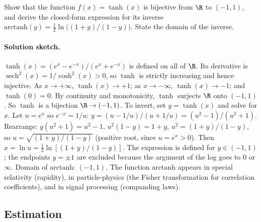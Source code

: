 \begin{exercise}
Show that the function $f(x) = \tanh(x)$ is bijective from $\R$ to
$(-1, 1)$, and derive the closed-form expression for its inverse
$\mathrm{arctanh}(y) = \tfrac{1}{2} \ln\bigl((1+y)/(1-y)\bigr)$.
State the domain of the inverse.

\paragraph{Solution sketch.}
$\tanh(x) = (e^{x} - e^{-x})/(e^{x} + e^{-x})$ is defined on all
of $\R$. Its derivative is $\operatorname{sech}^{2}(x) = 1/\cosh^{2}
(x) > 0$, so $\tanh$ is strictly increasing and hence injective.
As $x \to +\infty$, $\tanh(x) \to +1$; as $x \to -\infty$,
$\tanh(x) \to -1$; and $\tanh(0) = 0$. By continuity and
monotonicity, $\tanh$ surjects $\R$ onto $(-1, 1)$. So $\tanh$ is
a bijection $\R \to (-1, 1)$. To invert, set $y = \tanh(x)$ and
solve for $x$. Let $u = e^{x}$ so $e^{-x} = 1/u$:
$y = (u - 1/u)/(u + 1/u) = (u^{2} - 1)/(u^{2} + 1)$. Rearrange:
$y(u^{2} + 1) = u^{2} - 1$, $u^{2}(1 - y) = 1 + y$, $u^{2} =
(1 + y)/(1 - y)$, so $u = \sqrt{(1 + y)/(1 - y)}$ (positive root,
since $u = e^{x} > 0$). Then $x = \ln u = \tfrac{1}{2} \ln[(1 + y)/
(1 - y)]$. The expression is defined for $y \in (-1, 1)$; the
endpoints $y = \pm 1$ are excluded because the argument of the
log goes to $0$ or $\infty$. Domain of $\mathrm{arctanh}$: $(-1, 1)$.
The function $\mathrm{arctanh}$ appears in special relativity
(rapidity), in particle-physics (the Fisher transformation for
correlation coefficients), and in signal processing (companding
laws).
\end{exercise}

\subsection*{Estimation}

